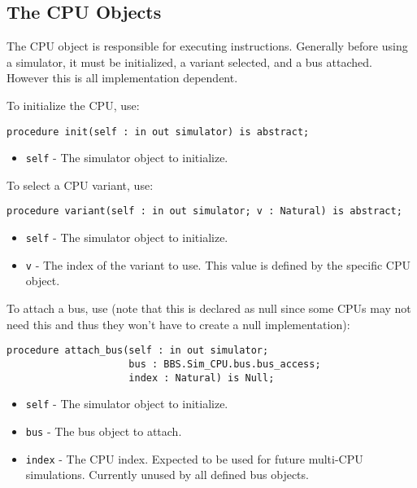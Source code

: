 \documentclass[10pt, openany]{book}
\newcommand{\keyword}[1]{\texttt{#1}}
\begin{document}
\subsection{The CPU Objects}
The CPU object is responsible for executing instructions.  Generally before using a simulator, it must be initialized, a variant selected, and a bus attached.  However this is all implementation dependent.

To initialize the CPU, use:
\begin{lstlisting}
procedure init(self : in out simulator) is abstract;
\end{lstlisting}
\begin{itemize}
  \item \keyword{self} - The simulator object to initialize.
\end{itemize}

To select a CPU variant, use:
\begin{lstlisting}
procedure variant(self : in out simulator; v : Natural) is abstract;
\end{lstlisting}
\begin{itemize}
  \item \keyword{self} - The simulator object to initialize.
  \item \keyword{v} - The index of the variant to use.  This value is defined by the specific CPU object.
\end{itemize}

To attach a bus, use (note that this is declared as null since some CPUs may not need this and thus they won't have to create a null implementation):
\begin{lstlisting}
procedure attach_bus(self : in out simulator;
                     bus : BBS.Sim_CPU.bus.bus_access;
                     index : Natural) is Null;
\end{lstlisting}
\begin{itemize}
  \item \keyword{self} - The simulator object to initialize.
  \item \keyword{bus} - The bus object to attach.
  \item \keyword{index} - The CPU index.  Expected to be used for future multi-CPU simulations.  Currently unused by all defined bus objects.
\end{itemize}
\end{document}
